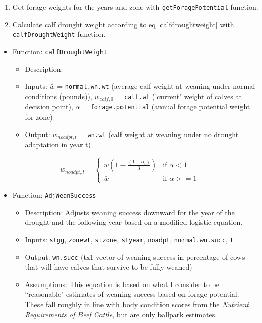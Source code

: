 \documentclass[11pt]{article}
\begin{document}
\begin{enumerate}
\item Get forage weights for the years and zone with \verb!getForagePotential! function.
\item Calculate calf drought weight according to eq \ref{calfdroughtweight} with \verb!calfDroughtWeight! function.
\end{enumerate}



\begin{itemize}
\item Function: \verb!calfDroughtWeight!
	\begin{itemize}
	\item Description:
	\item Inputs: $\bar{w}$ = \verb!normal.wn.wt! (average calf weight at weaning under normal conditions (pounds)), $w_{calf, 0}$ = \verb!calf.wt! ('current' weight of calves at decision point), $\alpha$ = \verb!forage.potential! (annual forage potential weight for zone)
	\item Output: $w_{noadpt, t}$ = \verb!wn.wt! (calf weight at weaning under no drought adaptation in year t)
	\end{itemize}
\end{itemize}
\begin{equation} \label{calfdroughtweight}
w_{noadpt, t} = 
\begin{cases}
\bar{w} \left(1 - \frac{(1 - \alpha_t)}{3}\right) & \text{if } \alpha < 1 \\
\bar{w} & \text{if } \alpha >= 1
\end{cases}
\end{equation}

\begin{itemize}
\item Function: \verb!AdjWeanSuccess!
	\begin{itemize}
	\item Description: Adjusts weaning success downward for the year of the drought and the following year based on a modified logistic equation. 
	\item Inputs: \verb!stgg!, \verb!zonewt!, \verb!stzone!, \verb!styear!, \verb!noadpt!, \verb!normal.wn.succ!, \verb!t!
	\item Output: \verb!wn.succ! (tx1 vector of weaning success in percentage of cows that will have calves that survive to be fully weaned)
	\item Assumptions: This equation is based on what I consider to be ``reasonable" estimates of weaning success based on forage potential. These fall roughly in line with body condition scores from the \textit{Nutrient Requirements of Beef Cattle}, but are only ballpark estimates.
	\end{itemize}
\end{itemize}
\end{document}
